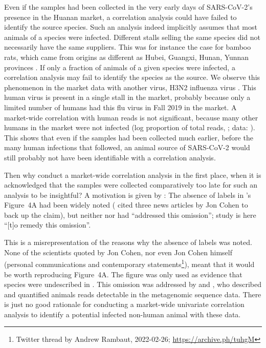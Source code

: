 \documentclass[11pt]{article}
\def \sct {\mbox{SARS-CoV-2}}
\begin{document}
Even if the samples had been collected in the very early days of \sct{}'s presence in the Huanan market, a correlation analysis could have failed to identify the source species. Such an analysis indeed implicitly assumes that most animals of a species were infected. Different stalls selling the same species did not necessarily have the same suppliers. This was for instance the case for bamboo rats, which came from origins as different as Hubei, Guangxi, Hunan, Yunnan provinces \citep[annexes pp.189--191]{WHO2021}. If only a fraction of animals of a given species were infected, a correlation analysis may fail to identify the species as the source. We observe this phenomenon in the market data with another virus, H3N2 influenza virus \citep{ACC2023bioRxiv}. This human virus is present in a single stall in the market, probably because only a limited number of humans had this flu virus in Fall 2019 in the market. A market-wide correlation with human reads is not significant, because many other humans in the market were not infected (log proportion of total reads, \ACCAllHNHS{}; data: \citet{ACC2023bioRxiv}). This shows that even if the samples had been collected much earlier, before the many human infections that followed, an animal source of \sct{} would still probably not have been identifiable with a correlation analysis. 

Then why conduct a market-wide correlation analysis in the first place, when it is acknowledged that the samples were collected comparatively too late for such an analysis to be insightful? A motivation is given by \citet{Bloom2023VE}: The absence of labels in \citet{Liu2022RS}'s Figure~4A had been widely noted (\citet{Bloom2023VE} cited three news articles by Jon Cohen to back up the claim), but neither \citet{ACC2023Zenodo} nor \citet{Liu2023Nature} had ``addressed this omission''; \citet{Bloom2023VE} study is here ``[t]o remedy this omission''. 

This is a misrepresentation of the reasons why the absence of labels was noted. None of the scientists quoted by Jon Cohen, nor even Jon Cohen himself (personal communications and contemporary statements\footnote{Twitter thread by Andrew Rambaut, 2022-02-26; \url{https://archive.ph/tuhgM}}), meant that it would be worth reproducing Figure~4A. The figure was only used as evidence that species were undescribed in \citet{Liu2022RS}. This omission was addressed by \citet{ACC2023Zenodo} and \citet{Liu2023Nature}, who described and quantified animals reads detectable in the metagenomic sequence data. There is just no good rationale for conducting a market-wide univariate correlation analysis to identify a potential infected non-human animal with these data. 
\end{document}

